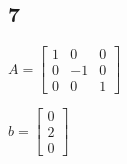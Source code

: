 \documentclass{article}
\begin{document}
\subsection*{7}
$A = 
\begin{bmatrix}
1  &  0 & 0 \\
0  & -1 & 0 \\
0  &  0 & 1
\end{bmatrix}$
 
$ b = 
\begin{bmatrix}
0 \\
2 \\
0
\end{bmatrix}$
\end{document}
